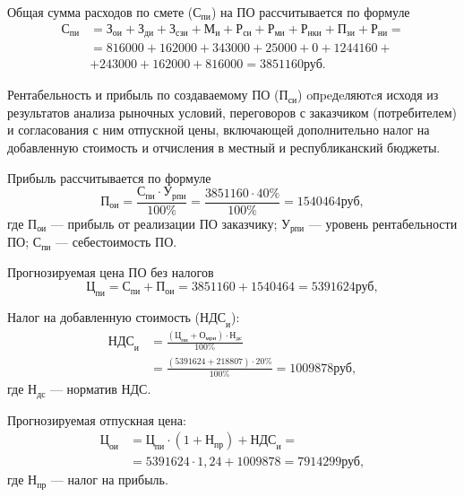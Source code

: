 Общая сумма расходов по смете (\( \text{С}_{\text{пи}} \)) на ПО рассчитывается по формуле
\begin{align*}
  \text{С}_{\text{пи}} &= \text{З}_{\text{ои}} + \text{З}_{\text{ди}} + \text{З}_{\text{сзи}} + \text{М}_{\text{и}} + \text{Р}_{\text{си}} + \text{Р}_{\text{ми}} + \text{Р}_{\text{нки}} + \text{П}_{\text{зи}} + \text{Р}_{\text{ни}} =\\
  &= 816000 + 162000 + 343000 + 25000 + 0 + 1244160 +\\
  &+ 243000 + 162000 + 816000 = 3851160 \text{руб}.
\end{align*}

Рентабельность и прибыль по создаваемому ПО (\( \text{П}_{\text{си}} \)) oпpeдeляютcя исходя из результатов анализа рыночных условий, переговоров с заказчиком (потребителем) и согласования с ним отпускной цены, включающей дополнительно налог на добавленную стоимость и отчисления в местный и республиканский бюджеты.

Прибыль рассчитывается по формуле
\begin{displaymath}
  \text{П}_{\text{ои}} = \frac{\text{С}_{\text{пи}} \cdot \text{У}_{\text{рпи}}}{100\%} = \frac{3851160 \cdot 40\%}{100\%} = 1540464 \text{руб},
\end{displaymath}
где \( \text{П}_{\text{ои}} \) --- прибыль от реализации ПО заказчику; \( \text{У}_{\text{рпи}} \) --- уровень рентабельности ПО; \( \text{С}_{\text{пи}} \) --- себестоимость ПО.

Прогнозируемая цена ПО без налогов
\begin{displaymath}
  \text{Ц}_{\text{пи}} = \text{С}_{\text{пи}} + \text{П}_{\text{ои}} = 3851160 + 1540464 = 5391624 \text{руб},
\end{displaymath}

Налог на добавленную стоимость (\( \text{НДС}_{\text{и}} \)):
\begin{align*}
  \text{НДС}_{\text{и}} &= \frac{(\text{Ц}_{\text{пи}} + \text{О}_{\text{мри}}) \cdot \text{Н}_{\text{дс}}}{100\%}\\
  &= \frac{(5391624 + 218807) \cdot 20\%}{100\%} = 1009878 \text{руб},
\end{align*}
где \( \text{Н}_{\text{дс}} \) --- норматив НДС.

Прогнозируемая отпускная цена:
\begin{align*}
  \text{Ц}_{\text{ои}} &= \text{Ц}_{\text{пи}} \cdot (1 + \text{Н}_{\text{пр}}) + \text{НДС}_{\text{и}}=\\
  &= 5391624 \cdot 1,24 + 1009878 = 7914299 \text{руб},
\end{align*}
где \( \text{Н}_{\text{пр}} \) --- налог на прибыль.

